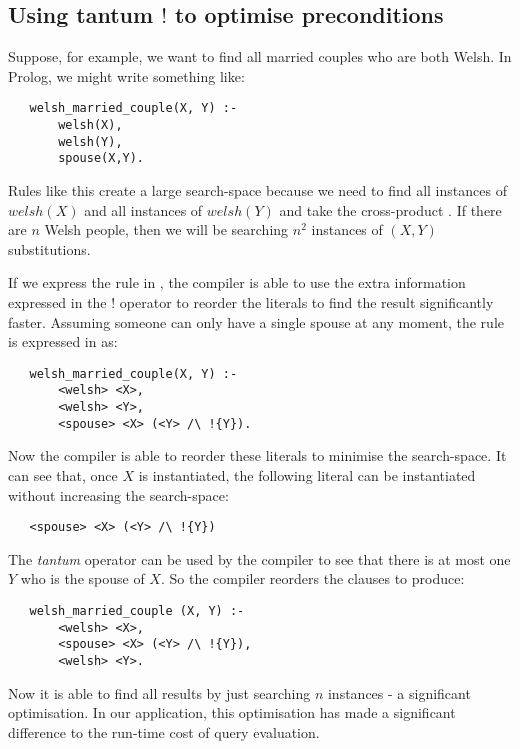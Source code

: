 \subsection{Using tantum $!$  to optimise preconditions}
\label{optimizingpreconditions}
Suppose, for example, we want to find all married couples who are both Welsh.
In Prolog, we might write something like:
\begin{verbatim}
   welsh_married_couple(X, Y) :-
       welsh(X),
       welsh(Y),
       spouse(X,Y).
\end{verbatim}	
Rules like this create a large search-space because we need to find all instances of $welsh(X)$ and all instances of  $welsh(Y)$ and take the cross-product \cite{smith-and-genesereth}. If there are $n$ Welsh people, then we will be searching $n^2$ instances of $(X,Y)$ substitutions.

If we express the rule in \cathoristic{}, the compiler is able to use the extra information expressed in the $!$ operator to reorder the literals to find the result significantly faster.
Assuming someone can only have a single spouse at any moment, the rule is expressed in \cathoristic{} as:
\begin{verbatim}
   welsh_married_couple(X, Y) :-
       <welsh> <X>,
       <welsh> <Y>,
       <spouse> <X> (<Y> /\ !{Y}).
\end{verbatim}	
Now the compiler is able to reorder these literals to minimise the search-space. 
It can see that, once $X$ is instantiated, the following literal can be instantiated without increasing the search-space:
\begin{verbatim}
   <spouse> <X> (<Y> /\ !{Y})
\end{verbatim}
The \emph{tantum} operator can be used by the compiler to see that there is at most one $Y$ who is the spouse of $X$.
So the compiler reorders the clauses to produce:
\begin{verbatim}
   welsh_married_couple (X, Y) :-
       <welsh> <X>,
       <spouse> <X> (<Y> /\ !{Y}),
       <welsh> <Y>.
\end{verbatim}	
Now it is able to find all results by just searching $n$ instances - a significant optimisation.
In our application, this optimisation has made a significant difference to the run-time cost of query evaluation.






